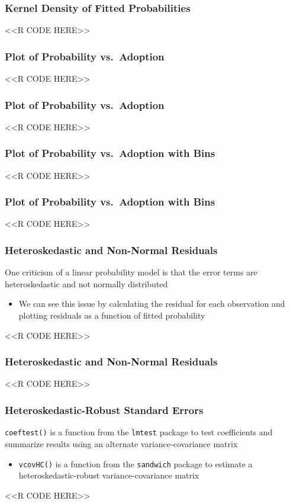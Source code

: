 \documentclass{beamer}
\begin{document}
\begin{frame}[fragile]\frametitle{Kernel Density of Fitted Probabilities}
    <<R CODE HERE>>
\end{frame}

\begin{frame}[fragile]\frametitle{Plot of Probability vs.\ Adoption}
    <<R CODE HERE>>
\end{frame}

\begin{frame}[fragile]\frametitle{Plot of Probability vs.\ Adoption}
    <<R CODE HERE>>
\end{frame}

\begin{frame}[fragile]\frametitle{Plot of Probability vs.\ Adoption with Bins}
    <<R CODE HERE>>
\end{frame}

\begin{frame}[fragile]\frametitle{Plot of Probability vs.\ Adoption with Bins}
    <<R CODE HERE>>
\end{frame}

\begin{frame}[fragile]\frametitle{Heteroskedastic and Non-Normal Residuals}
    One criticism of a linear probability model is that the error terms are heteroskedastic and not normally distributed
    \begin{itemize}
        \item We can see this issue by calculating the residual for each observation and plotting residuals as a function of fitted probability
    \end{itemize}
    <<R CODE HERE>>
\end{frame}

\begin{frame}[fragile]\frametitle{Heteroskedastic and Non-Normal Residuals}
    <<R CODE HERE>>
\end{frame}

\begin{frame}[fragile]\frametitle{Heteroskedastic-Robust Standard Errors}
    \texttt{coeftest()} is a function from the \texttt{lmtest} package to test coefficients and summarize results using an alternate variance-covariance matrix
    \begin{itemize}
        \item \texttt{vcovHC()} is a function from the \texttt{sandwich} package to estimate a heteroskedastic-robust variance-covariance matrix
    \end{itemize}
    <<R CODE HERE>>
\end{frame}
\end{document}
